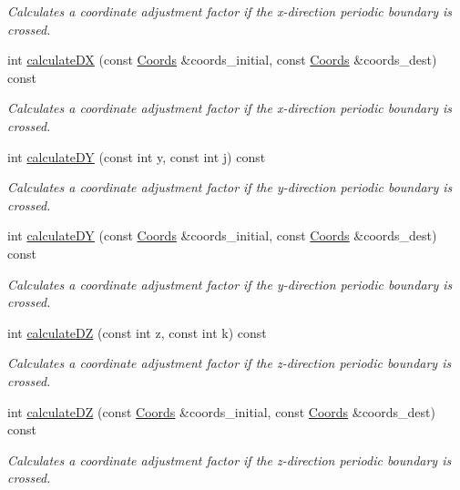 \begin{DoxyCompactItemize}
\begin{DoxyCompactList}\small\item\em Calculates a coordinate adjustment factor if the x-\/direction periodic boundary is crossed. \end{DoxyCompactList}\item 
int \hyperlink{class_lattice_ad89c5473dd37339ede9fb3d0c3db4300}{calculate\+DX} (const \hyperlink{struct_coords}{Coords} \&coords\+\_\+initial, const \hyperlink{struct_coords}{Coords} \&coords\+\_\+dest) const
\begin{DoxyCompactList}\small\item\em Calculates a coordinate adjustment factor if the x-\/direction periodic boundary is crossed. \end{DoxyCompactList}\item 
int \hyperlink{class_lattice_acdeca889f7df11fe299f8b7941198c83}{calculate\+DY} (const int y, const int j) const
\begin{DoxyCompactList}\small\item\em Calculates a coordinate adjustment factor if the y-\/direction periodic boundary is crossed. \end{DoxyCompactList}\item 
int \hyperlink{class_lattice_a4e8b3577701ec0cefce595f6956b22e3}{calculate\+DY} (const \hyperlink{struct_coords}{Coords} \&coords\+\_\+initial, const \hyperlink{struct_coords}{Coords} \&coords\+\_\+dest) const
\begin{DoxyCompactList}\small\item\em Calculates a coordinate adjustment factor if the y-\/direction periodic boundary is crossed. \end{DoxyCompactList}\item 
int \hyperlink{class_lattice_a584ff9c528ebe46a6aea6ed652d107f4}{calculate\+DZ} (const int z, const int k) const
\begin{DoxyCompactList}\small\item\em Calculates a coordinate adjustment factor if the z-\/direction periodic boundary is crossed. \end{DoxyCompactList}\item 
int \hyperlink{class_lattice_a76b38079e102e17c79b13a3398a404a0}{calculate\+DZ} (const \hyperlink{struct_coords}{Coords} \&coords\+\_\+initial, const \hyperlink{struct_coords}{Coords} \&coords\+\_\+dest) const
\begin{DoxyCompactList}\small\item\em Calculates a coordinate adjustment factor if the z-\/direction periodic boundary is crossed. \end{DoxyCompactList}\item 

\end{DoxyCompactItemize}
